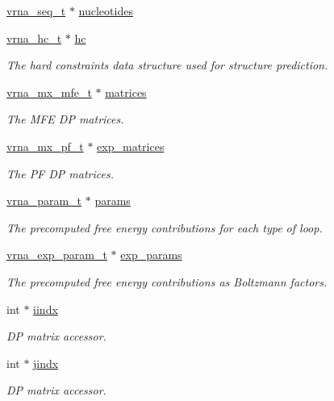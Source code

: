\begin{Indent}
\begin{DoxyCompactItemize}
\mbox{\hyperlink{sequence_8h_aa35bee3061759495467070b47d0e1f22}{vrna\+\_\+seq\+\_\+t}} $\ast$ \mbox{\hyperlink{group__fold__compound_a855b503aefd052430bf463d8518d2ff5}{nucleotides}}
\item 
\mbox{\hyperlink{group__hard__constraints_gac7e4c4f8abe3163a68110c5bff24e01d}{vrna\+\_\+hc\+\_\+t}} $\ast$ \mbox{\hyperlink{group__fold__compound_aceaa904dbf50092d403ca99422e8f824}{hc}}
\begin{DoxyCompactList}\small\item\em The hard constraints data structure used for structure prediction. \end{DoxyCompactList}\item 
\mbox{\hyperlink{group__dp__matrices_gae5aef35d016475e758f619b7bcb534f9}{vrna\+\_\+mx\+\_\+mfe\+\_\+t}} $\ast$ \mbox{\hyperlink{group__fold__compound_aca8be7bdc65bafe2172c6ee777f18568}{matrices}}
\begin{DoxyCompactList}\small\item\em The M\+FE DP matrices. \end{DoxyCompactList}\item 
\mbox{\hyperlink{group__dp__matrices_ga68729ab3fed26bdd1806fa814f172fc1}{vrna\+\_\+mx\+\_\+pf\+\_\+t}} $\ast$ \mbox{\hyperlink{group__fold__compound_afc38ed5a1028a2712d2365274bf49727}{exp\+\_\+matrices}}
\begin{DoxyCompactList}\small\item\em The PF DP matrices. \end{DoxyCompactList}\item 
\mbox{\hyperlink{group__energy__parameters_ga8a69ca7d787e4fd6079914f5343a1f35}{vrna\+\_\+param\+\_\+t}} $\ast$ \mbox{\hyperlink{group__fold__compound_a19b8720c2c5321c1b97c830bd17566ea}{params}}
\begin{DoxyCompactList}\small\item\em The precomputed free energy contributions for each type of loop. \end{DoxyCompactList}\item 
\mbox{\hyperlink{group__energy__parameters_ga01d8b92fe734df8d79a6169482c7d8d8}{vrna\+\_\+exp\+\_\+param\+\_\+t}} $\ast$ \mbox{\hyperlink{group__fold__compound_a7052a5d24f6091b9c5f79edcc9456a12}{exp\+\_\+params}}
\begin{DoxyCompactList}\small\item\em The precomputed free energy contributions as Boltzmann factors. \end{DoxyCompactList}\item 
int $\ast$ \mbox{\hyperlink{group__fold__compound_afdead4cf55c882d3497e779573e17e03}{iindx}}
\begin{DoxyCompactList}\small\item\em DP matrix accessor. \end{DoxyCompactList}\item 
int $\ast$ \mbox{\hyperlink{group__fold__compound_a5037235dee512efd85ca543780bbca1a}{jindx}}
\begin{DoxyCompactList}\small\item\em DP matrix accessor. \end{DoxyCompactList}\end{DoxyCompactItemize}
\end{Indent}
